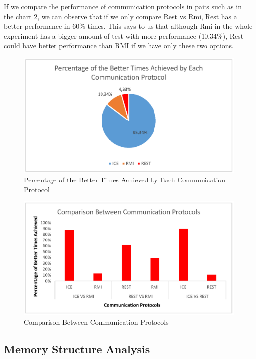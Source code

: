 If we compare the performance of communication protocols in pairs such as in the chart \ref{fig:comparisonCommunicationProtocols}, we can observe that if we only compare Rest vs Rmi, Rest has a better performance in 60\% times. This says to us that although Rmi in the whole experiment has a bigger amount of test with more performance (10,34\%), Rest could have better performance than RMI if we have only these two options.
\begin{figure}[H]
	\centering
	\includegraphics[trim=0.5cm 19cm 1cm 1cm]{fig/betterTimesCommunicationProtocol.eps}
	\caption{Percentage of the Better Times Achieved by Each Communication Protocol}
	\label{fig:betterTimesCommunicationProtocol}
\end{figure}

\begin{figure}[H]
	\centering
	\includegraphics[trim=0.5cm 19cm 1cm 1cm]{fig/comparisonCommunicationProtocols.eps}
	\caption{Comparison Between Communication Protocols}
	\label{fig:comparisonCommunicationProtocols}
\end{figure}

\subsection{Memory Structure Analysis}
\label{subsec:memoryAnalysis}

